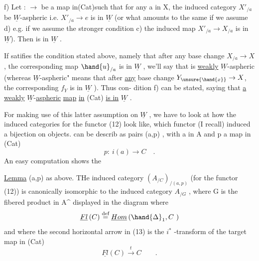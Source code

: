 
f) Let : $\to$  be a map in(Cat)such that for any a in X, the
induced category $X'_{/a}$ be $\underline{W}$-aspheric i.e. $X'_{/a}\to e$ is in $\underline{W}$
(or what amounts to the same if we assume d) e.g. if we assume
the stronger condition c)\hand{,} the induced map $X'_{/a}\to X_{/a}$ is in $\underline{W}$).
Then  is in $\underline{W}$ .

If  satifies the condition stated above, namely that after any base
change $X_{/a}\to X$ , the corresponding map $\hand{u}_{/a}$ is in $\underline{W}$ , we'll say that 
is \uline{weakly} $\underline{W}$-aspheric (whereas  $\underline{W}$-aspheric" means that after \uline{any}
base change $Y_{\unsure{\hand{x}}}\to X$, the corresponding  $f_Y$ is in $\underline{W}$ ). Thus con-%
dition f) can be stated, saying that \uline{a weakly} $\underline{W}$-\uline{aspheric} \uline{map} \uline{in} (Cat)
\uline{is in} $\underline{W}$ .

For  making use of this latter assumption on $\underline{W}$ , we have to
look at how the induced categories for the functor (12) look like, which
functor (I recall) induced a bijection on objects.  can be describ
as pairs (a,p) , with a in A and p a map in (Cat)
\[ p:\ i(a)\to C \quad . \]
An easy computation shows the

\uline{Lemma}  (a,p) as above. THe induced category $({A}_{/C})_{/(a,p)}$ (for
the functor (12)) is canonically isomorphic to the induced category
$A_{/G}$ , where G is the fibered product in A\^{} displayed in the diagram
where
\[ \underline{Fl}\,(C) \overset{\text{def}}{=} \underline{Hom}\,(\hand{\Delta}_1,C\ ) \]
and where the second horizontal arrow in (13) is the $i^{*}$ -transform of the
target map in (Cat)
\[ \underline{Fl}(C) \xrightarrow{\ t\ } C \qquad . \]


